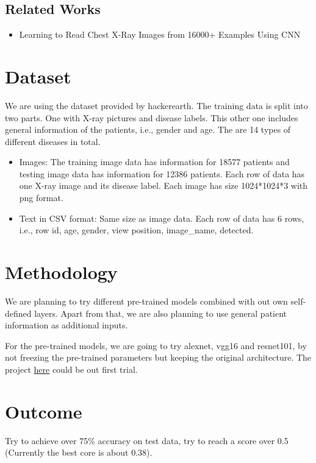 \documentclass[10pt,twocolumn,letterpaper]{article}
\begin{document}
    \subsection{Related Works}
        \begin{itemize}
            \item Learning to Read Chest X-Ray Images from 16000+ Examples Using CNN \cite{dong2017learning}
        \end{itemize}

\section{Dataset}
We are using the dataset provided by hackerearth. The training data is split into two parts. One with X-ray pictures and disease labels. This other one includes general information of the patients, i.e., gender and age. The are 14 types of different diseases in total.

\begin{itemize}
	\item Images:  The training image data has information for 18577 patients and testing image data has information for 12386 patients. Each row of data has one X-ray image and its disease label. Each image has size 1024*1024*3 with png format.
	\item Text in CSV format: Same size as image data. Each row of data has 6 rows, i.e., row id, age, gender, view position, image\_name, detected.
\end{itemize}

\section{Methodology}
We are planning to try different pre-trained models combined with out own self-defined layers. Apart from that, we are also planning to use general patient information as additional inputs.

For the pre-trained models, we are going to try alexnet, vgg16 and resnet101, by not freezing the pre-trained parameters but keeping the original architecture. The project \href{https://github.com/ayush1997/Xvision}{here} could be out first trial.

\section{Outcome}
    Try to achieve over 75\% accuracy on test data, try to reach a score over 0.5 (Currently the best core is about 0.38).

{\small


}
\end{document}
